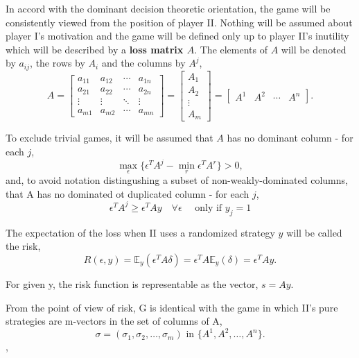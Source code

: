 \documentclass[11pt]{article}
\numberwithin{equation}{section}
\theoremstyle{boldStyle}
\begin{document}
In accord with the dominant decision theoretic orientation, the game will be consistently viewed from the position of player II. 
Nothing will be assumed about player I's motivation and the game will be defined only up to player II's inutility which will be described by a \textbf{loss matrix $A$}. 
The elements of $A$ will be denoted by $a_{ij}$, the rows by $A_i$ and the columns by $A^j$,
\begin{equation} \label{eq:2.3}
    A = \begin{bmatrix}
    a_{11} & a_{12} & \cdots & a_{1n} \\
    a_{21} & a_{22} & \cdots & a_{2n} \\
    \vdots & \vdots & \ddots & \vdots \\
    a_{m1} & a_{m2} & \cdots & a_{mn}
    \end{bmatrix} = \begin{bmatrix} A_1 \\ A_2 \\ \vdots \\ A_m \end{bmatrix} = \begin{bmatrix} A^1 & A^2 & \cdots & A^n \end{bmatrix}.
\end{equation}

To exclude trivial games, it will be assumed that $A$ has no dominant column - for each $j$,
\begin{equation} \label{eq:2.4}
    \max_{\epsilon} \{ \epsilon^T A^j - \min_{r} \epsilon^T A^r \} > 0,
\end{equation}
and, to avoid notation distingushing a subset of non-weakly-dominated columns, that A has no dominated ot duplicated column - for each $j$,
\begin{equation} \label{eq:2.5}
    \epsilon^T A^j \geq \epsilon^T Ay \quad \forall \epsilon \quad \text{ only if } y_j = 1
\end{equation}

\bigbreak

The expectation of the loss when II uses a randomized strategy \( y \) will be called the risk,
\[
    R(\epsilon, y) = \mathbb{E}_y(\epsilon^T A \delta) = \epsilon^T A \mathbb{E}_y(\delta) = \epsilon^T A y.
\]

For given y, the risk function is representable as the vector, $s = Ay$.

From the point of view of risk, G is identical with the game in which II's pure strategies are m-vectors in the set of columns of A, 
\begin{equation} \label{eq:2.6}
    \sigma = (\sigma_1, \sigma_2, \ldots, \sigma_m) \text{ in } \{A^1, A^2, \ldots, A^n\}.
\end{equation},
\end{document}
